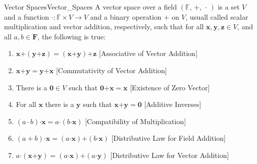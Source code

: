 \documentclass[crop=false,class=article]{standalone}                           %
\begin{document}
        \begin{fdefinition}{Vector Spaces}{Vector_Spaces}
            A vector space over a field $(\mathbb{F},\,+,\,\cdot\,)$ is a
            set $V$ and a function
            $\boldsymbol{\cdot}:\mathbb{F}\times{V}\rightarrow{V}$ and
            a binary operation $\boldsymbol{+}$ on $V$, usuall called
            scalar multiplication and vector addition, respectively, 
            such that for all $\mathbf{x},\mathbf{y},\mathbf{z}\in{V}$,
            and all $a,b\in\mathbf{F}$, the following is true:
            \begin{enumerate}
                \item $\mathbf{x}\boldsymbol{+}%
                       (\mathbf{y}\boldsymbol{+}\mathbf{z})=%
                       (\mathbf{x}\boldsymbol{+}\mathbf{y})%
                       \boldsymbol{+}\mathbf{z}$
                      \hfill[Associative of Vector Addition]
                \item $\mathbf{x}\boldsymbol{+}\mathbf{y}=%
                       \mathbf{y}\boldsymbol{+}\mathbf{x}$
                      \hfill[Commutativity of Vector Addition]
                \item There is a $\mathbf{0}\in{V}$ such that
                      $\mathbf{0}\boldsymbol{+}\mathbf{x}=\mathbf{x}$
                      \hfill[Existence of Zero Vector]
                \item For all $\mathbf{x}$ there is a $\mathbf{y}$ such that
                      $\mathbf{x}\boldsymbol{+}\mathbf{y}=\mathbf{0}$
                      \hfill[Additive Inverses]
                \item $(a\cdot{b})\boldsymbol{\cdot}\mathbf{x}=%
                        a\boldsymbol{\cdot}(b\boldsymbol{\cdot}\mathbf{x})$
                      \hfill[Compatibility of Multiplication]
                \item $(a+b)\boldsymbol{\cdot}\mathbf{x}=%
                       (a\boldsymbol{\cdot}\mathbf{x})\boldsymbol{+}%
                       (b\boldsymbol{\cdot}\mathbf{x})$
                      \hfill[Distributive Law for Field Addition]
                \item $a\boldsymbol{\cdot}(\mathbf{x}\boldsymbol{+}\mathbf{y})=%
                       (a\boldsymbol{\cdot}\mathbf{x})\boldsymbol{+}%
                       (a\boldsymbol{\cdot}\mathbf{y})$
                      \hfill[Distributive Law for Vector Addition]
            \end{enumerate}
        \end{fdefinition}
\end{document}
